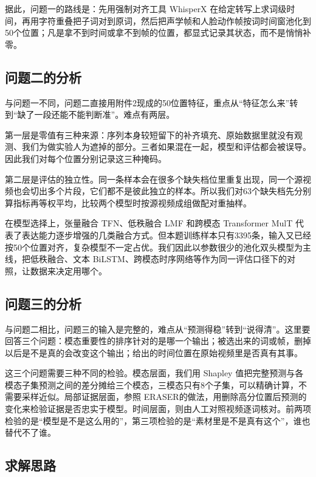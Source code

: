 据此，问题一的路线是：先用强制对齐工具 WhisperX\cite{bain2023whisperx} 在给定转写上求词级时间，再用字符重叠把子词对到原词，然后把声学帧和人脸动作帧按词时间窗池化到50个位置；凡是拿不到时间或拿不到帧的位置，都显式记录其状态，而不是悄悄补零。

\subsection{问题二的分析}

与问题一不同，问题二直接用附件2现成的50位置特征，重点从“特征怎么来”转到“缺了一段还能不能判断准”。难点有两层。

第一层是零值有三种来源：序列本身较短留下的补齐填充、原始数据里就没有观测、我们为做实验人为遮掉的部分。三者如果混在一起，模型和评估都会被误导。因此我们对每个位置分别记录这三种掩码。

第二层是评估的独立性。同一条样本会在很多个缺失档位里重复出现，同一个源视频也会切出多个片段，它们都不是彼此独立的样本。所以我们对63个缺失档先分别算指标再等权平均，比较两个模型时按源视频成组做配对重抽样。

在模型选择上，张量融合 TFN\cite{zadeh2017tfn}、低秩融合 LMF\cite{liu2018lmf} 和跨模态 Transformer MulT\cite{tsai2019mult} 代表了表达能力逐步增强的几类融合方式。但本题训练样本只有3395条，输入又已经按50个位置对齐，复杂模型不一定占优。我们因此以参数很少的池化双头模型为主线，把低秩融合、文本 BiLSTM、跨模态时序网络等作为同一评估口径下的对照，让数据来决定用哪个。

\subsection{问题三的分析}

与问题二相比，问题三的输入是完整的，难点从“预测得稳”转到“说得清”。这里要回答三个问题：模态重要性的排序针对的是哪一个输出；被选出来的词或帧，删掉以后是不是真的会改变这个输出；给出的时间位置在原始视频里是否真有其事。

这三个问题需要三种不同的检验。模态层面，我们用 Shapley 值\cite{lundberg2017shap}把完整预测与各模态子集预测之间的差分摊给三个模态，三模态只有8个子集，可以精确计算，不需要采样近似。局部证据层面，参照 ERASER\cite{deyoung2020eraser}的做法，用删除高分位置后预测的变化来检验证据是否忠实于模型。时间层面，则由人工对照视频逐词核对。前两项检验的是“模型是不是这么用的”，第三项检验的是“素材里是不是真有这个”，谁也替代不了谁。

\subsection{求解思路}

